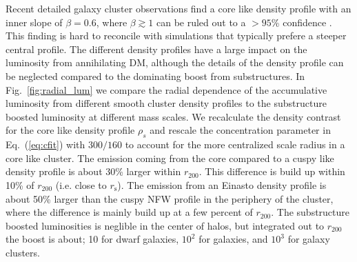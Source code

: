 \documentclass[10pt,aps,pra,reprint,amsmath,amsfonts,amssymb,showpacs]{revtex4-1}
\newcommand{\rmn}{\mathrm}
\newcommand{\s}{\rmn{s}}
\newcommand{\rhos}{\ensuremath{\rho_s}}
\newcommand{\rvir}{r_{200}}
\begin{document}
Recent detailed galaxy cluster observations find a core like density
profile with an inner slope of $\beta=0.6$, where $\beta\gtrsim 1$ can
be ruled out to a $>95$\% confidence \cite{2011ApJ...728L..39N}. This
finding is hard to reconcile with simulations that typically prefere a
steeper central profile. The different density profiles have a large
impact on the luminosity from annihilating DM, although the details of
the density profile can be neglected compared to the dominating boost
from substructures. In Fig.~\ref{fig:radial_lum} we compare the radial
dependence of the accumulative luminosity from different smooth
cluster density profiles to the substructure boosted luminosity at
different mass scales. We recalculate the density contrast for the
core like density profile $\rhos$ and rescale the concentration
parameter in Eq.~(\ref{eq:cfit}) with $300/160$
\cite{2011ApJ...728L..39N} to account for the more centralized scale
radius in a core like cluster. The emission coming from the core
compared to a cuspy like density profile is about 30\% larger within
$\rvir$. This difference is build up within 10\% of $\rvir$
(i.e. close to $r_\s$). The emission from an Einasto density
profile is about 50\% larger than the cuspy NFW profile in the
periphery of the cluster, where the difference is mainly build up at a
few percent of $\rvir$. The substructure boosted luminosities is
neglible in the center of halos, but integrated out to $\rvir$ the
boost is about; 10 for dwarf galaxies, $10^2$ for galaxies, and $10^3$
for galaxy clusters.
\end{document}
